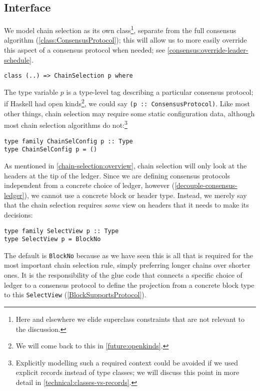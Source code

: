 \subsection{Interface}
\label{chain-selection:interface}

We model chain selection as its own class\footnote{Here and elsewhere we elide
superclass constraints that are not relevant to the discussion.}, separate from
the full consensus algorithm (\cref{class:ConsensusProtocol}); this will allow
us to more easily override this aspect of a consensus protocol when needed; see
\cref{consensus:override-leader-schedule}.

\begin{lstlisting}
class (..) => ChainSelection p where
\end{lstlisting}

The type variable $p$ is a type-level tag describing a particular consensus
protocol; if Haskell had open kinds\footnote{We will come back to this in
\cref{future:openkinds}.}, we could say \lstinline!(p :: ConsensusProtocol)!.
Like most other things, chain selection may require some static configuration
data, although most chain selection algorithms do not:\footnote{Explicitly
modelling such a required context could be avoided if we used explicit records
instead of type classes; we will discuss this point in more detail in
\cref{technical:classes-vs-records}.}

\begin{lstlisting}
type family ChainSelConfig p :: Type
type ChainSelConfig p = ()
\end{lstlisting}

As mentioned in \cref{chain-selection:overview}, chain selection will only look
at the headers at the tip of the ledger. Since we are defining consensus
protocols independent from a concrete choice of ledger, however
(\cref{decouple-consensus-ledger}), we cannot use a concrete block or header
type. Instead, we merely say that the chain selection requires \emph{some} view
on headers that it needs to make its decisions:

\begin{lstlisting}
type family SelectView p :: Type
type SelectView p = BlockNo
\end{lstlisting}

The default is \lstinline!BlockNo! because as we have seen this is all that is
required for the most important chain selection rule, simply preferring longer
chains over shorter ones. It is the responsibility of the glue code that
connects a specific choice of ledger to a consensus protocol to define the
projection from a concrete block type to this \lstinline!SelectView!
(\ref{BlockSupportsProtocol}).

